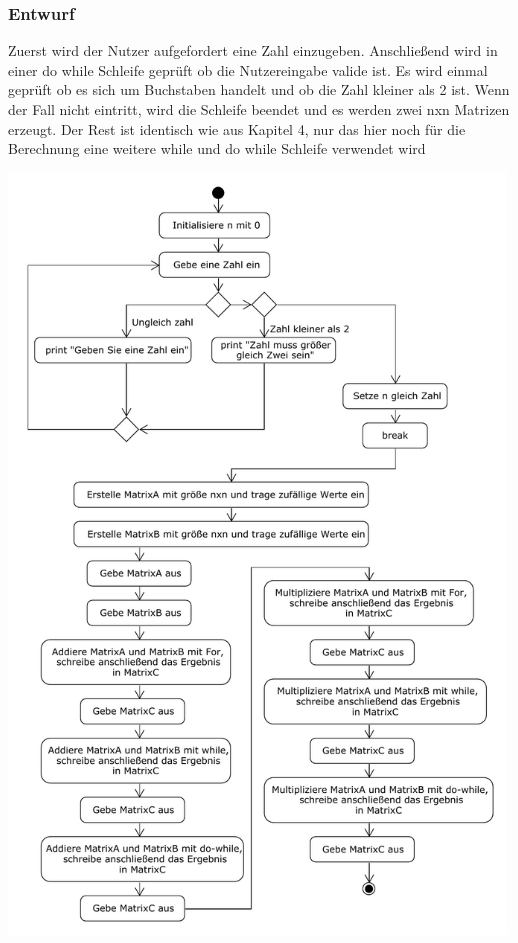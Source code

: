 \subsubsection{Entwurf}
Zuerst wird der Nutzer aufgefordert eine Zahl einzugeben. Anschließend wird in einer do while 
Schleife geprüft ob die Nutzereingabe valide ist. Es wird einmal geprüft ob es sich um Buchstaben handelt
und ob die Zahl kleiner als 2 ist. Wenn der Fall nicht eintritt, wird die Schleife beendet und es werden zwei
nxn Matrizen erzeugt. Der Rest ist identisch wie aus Kapitel 4, nur das hier noch für die Berechnung 
eine weitere while und do while Schleife verwendet wird
\begin{center}
	\includegraphics[width=0.99\textwidth]{uml/uml_c6_p1.pdf}
\end{center}

